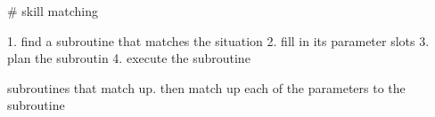 # skill matching

1. find a subroutine that matches the situation
2. fill in its parameter slots
3. plan the subroutin
4. execute the subroutine

subroutines that match up. then match up each of the parameters to the subroutine
